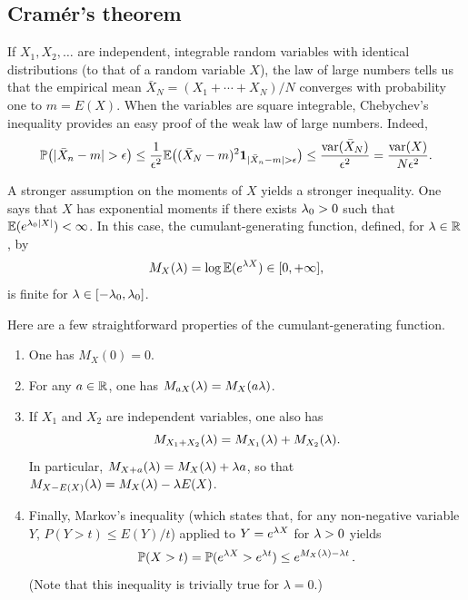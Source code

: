 \subsection{Cram\'er's theorem}
If $X_1, X_2, \ldots$ are independent, integrable random variables with identical distributions (to that of a random variable $X$), the law of large numbers tells us that the empirical mean $\bar X_N = (X_1 + \cdots + X_N)/N$ converges with probability one to $m=E(X)$. When the variables are square integrable, Chebychev's inequality provides an easy proof of the weak  law of large numbers. Indeed,
\[
\bm{\mathbb P}\big(|\bar X_n - m| > \epsilon\big) \leq \frac{1}{\epsilon^2} \bm{\mathbb E}\big((\bar X_N - m)^2{\bm 1}_{|\bar X_n - m| > \epsilon}\big) \leq \frac{\mathrm{var}(\bar X_N)}{\epsilon^2} = \frac{\mathrm{var}(X)}{N\epsilon^2}.
\]

A stronger assumption on the moments of $X$ yields a stronger inequality. One says that $X$ has exponential moments if there exists $\lambda_0 > 0$ such that $\bm{\mathbb E}(e^{\lambda_0|X|}) < \infty$. In this case, the cumulant-generating function, defined, for $\lambda\in{\mathbb{R}}$, by
\begin{equation}
\label{eq:laplace}
M_X(\lambda) = \log \bm{\mathbb E}(e^{\lambda X}) \in [0, +\infty], 
\end{equation}
is finite for $\lambda \in [-\lambda_0, \lambda_0]$. 

Here are a few straightforward properties of the cumulant-generating function. 
\begin{enumerate}[label=(\roman*)]
\item One has $M_X(0) = 0$. 
\item For any $a\in {\mathbb{R}}$, one has
$M_{aX}(\lambda) = M_X(a\lambda)$. 
\item If $X_1$ and $X_2$ are independent variables, one also has
\[
M_{X_1+X_2}(\lambda) = M_{X_1}(\lambda) + M_{X_2}(\lambda).
\]
In particular, $M_{X+a}(\lambda) = M_X(\lambda) + \lambda a$, so that $M_{X-E(X)}(\lambda)  = M_X(\lambda) - \lambda E(X)$.
\item
Finally, Markov's inequality (which states that, for any non-negative variable $Y$, $P(Y> t) \leq E(Y)/t$) applied to $Y = e^{\lambda X}$ for $\lambda> 0$ yields
\begin{equation}
\label{eq:markov.exp}
\bm{\mathbb P}(X>t) = \bm{\mathbb P}(e^{\lambda X} > e^{\lambda t}) \leq e^{M_X(\lambda) - \lambda t}\,.
\end{equation}
(Note that this inequality is trivially true for $\lambda=0$.)
\end{enumerate}


